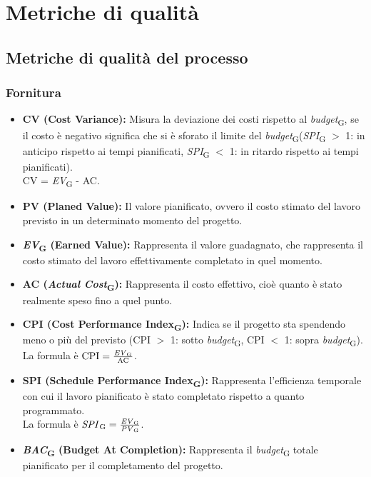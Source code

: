 \section{Metriche di qualità}\label{mdq}
\subsection{Metriche di qualità del processo}
\subsubsection{Fornitura}
\begin{itemize}
    \item \textbf{CV (Cost Variance):} Misura la deviazione dei costi rispetto al \textit{budget}\textsubscript{G}, se il costo è negativo significa che si è sforato il limite del \textit{budget}\textsubscript{G}(\textit{SPI}\textsubscript{G} \( > \) 1: in anticipo rispetto ai tempi pianificati, \textit{SPI}\textsubscript{G} \( < \) 1: in ritardo rispetto ai tempi pianificati).
    \\CV = \textit{EV}\textsubscript{G} - AC.
    \item \textbf{PV (Planed Value):} Il valore pianificato, ovvero il costo stimato del lavoro previsto in un determinato momento del progetto.
    \item \textbf{\textit{EV}\textsubscript{G} (Earned Value):} Rappresenta il valore guadagnato, che rappresenta il costo stimato del lavoro effettivamente completato in quel momento.
    \item \textbf{AC (\textit{Actual Cost}\textsubscript{G}):} Rappresenta il costo effettivo, cioè quanto è stato realmente speso fino a quel punto.
    \item \textbf{CPI (Cost Performance Index\textsubscript{G}):} Indica se il progetto sta spendendo meno o più del previsto (CPI \( > \) 1: sotto \textit{budget}\textsubscript{G}, CPI \( < \) 1: sopra \textit{budget}\textsubscript{G}). \\ La formula è \( \text{CPI} = \frac{\text{\textit{EV}\textsubscript{G}}}{\text{AC}} \).
    \item \textbf{SPI (Schedule Performance Index\textsubscript{G}):} Rappresenta l'efficienza temporale con cui il lavoro pianificato è stato completato rispetto a quanto programmato.
    \\ La formula è \( \text{\textit{SPI}\textsubscript{G}} = \frac{\text{\textit{EV}\textsubscript{G}}}{\text{\textit{PV}\textsubscript{G}}} \).
    \item \textbf{\textit{BAC}\textsubscript{G} (Budget At Completion):} Rappresenta il \textit{budget}\textsubscript{G} totale pianificato per il completamento del progetto.

\end{itemize}

